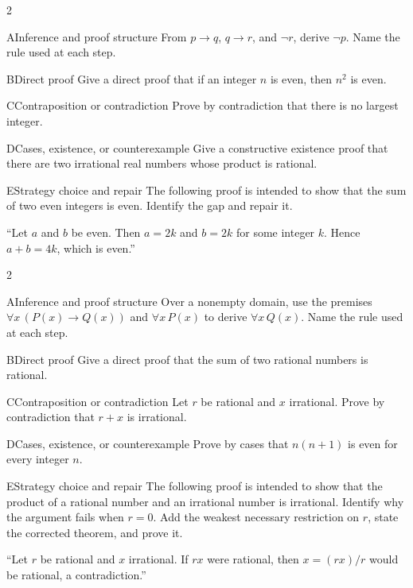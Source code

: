 \documentclass[9pt]{extarticle}
\begin{document}
\begin{multicols}{2}
\begin{CoreProblem}{A}{Inference and proof structure}
From $p\to q$, $q\to r$, and $\neg r$, derive $\neg p$. Name the rule used at
each step.
\end{CoreProblem}
\begin{CoreProblem}{B}{Direct proof}
Give a direct proof that if an integer $n$ is even, then $n^2$ is even.
\end{CoreProblem}
\begin{CoreProblem}{C}{Contraposition or contradiction}
Prove by contradiction that there is no largest integer.
\end{CoreProblem}
\columnbreak
\begin{CoreProblem}{D}{Cases, existence, or counterexample}
Give a constructive existence proof that there are two irrational real numbers
whose product is rational.
\end{CoreProblem}
\begin{CoreProblem}{E}{Strategy choice and repair}
The following proof is intended to show that the sum of two even integers is even. Identify the gap and repair it.

``Let $a$ and $b$ be even. Then $a=2k$ and $b=2k$ for some integer $k$. Hence $a+b=4k$, which is even.''
\end{CoreProblem}
\end{multicols}
\CoreWorkArea
\FormBreak
{}
\begin{multicols}{2}
\begin{CoreProblem}{A}{Inference and proof structure}
Over a nonempty domain, use the premises
$\forall x\,(P(x)\to Q(x))$ and $\forall x\,P(x)$ to derive
$\forall x\,Q(x)$. Name the rule used at each step.
\end{CoreProblem}
\begin{CoreProblem}{B}{Direct proof}
Give a direct proof that the sum of two rational numbers is rational.
\end{CoreProblem}
\begin{CoreProblem}{C}{Contraposition or contradiction}
Let $r$ be rational and $x$ irrational. Prove by contradiction that $r+x$ is irrational.
\end{CoreProblem}
\columnbreak
\begin{CoreProblem}{D}{Cases, existence, or counterexample}
Prove by cases that $n(n+1)$ is even for every integer $n$.
\end{CoreProblem}
\begin{CoreProblem}{E}{Strategy choice and repair}
The following proof is intended to show that the product of a rational number
and an irrational number is irrational. Identify why the argument fails when
$r=0$. Add the weakest necessary restriction on $r$, state the corrected
theorem, and prove it.

``Let $r$ be rational and $x$ irrational. If $rx$ were rational, then $x=(rx)/r$ would be rational, a contradiction.''
\end{CoreProblem}
\end{multicols}
\end{document}
